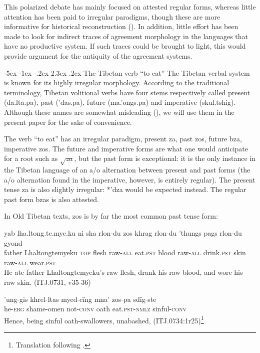 \documentclass[oldfontcommands,twoside,a4paper,12pt]{memoir}
\makeatletter
\newcommand{\ipa}[1]{{\phon #1}}
\newcommand{\allat}{\textsc{all}}
\newcommand{\conv}{\textsc{conv}}
\newcommand{\erg}{\textsc{erg}}
\newcommand{\nmlz}{\textsc{nmlz}}
\newcommand{\pst}{\textsc{pst}}
\newcommand{\topic}{\textsc{top}}
\newcommand{\racine}[1]{\begin{math}\sqrt{#1}\end{math}}
\renewcommand\section{\@startsection{section}{0}{\z@}%
                                   {-5ex \@plus -1ex \@minus -.2ex}%
                                   {2.3ex \@plus.2ex}%
                                   {\flushleft\large\bfseries}}
\makeatother
\begin{document}
This polarized debate has mainly focused on attested regular forms, whereas little attention has been paid to irregular paradigms, though these are more informative for historical reconstruction (\citealt{jacques07chang}). In addition, little effort has been made to look for indirect traces of agreement morphology in the languages that have no productive system. If such traces could be brought to light, this would provide argument for the antiquity of the agreement systems.

\section{The Tibetan verb ``to eat''}
The Tibetan verbal system is known for its highly irregular morphology. According to the traditional terminology, Tibetan volitional verbs have four stems respectively called present (da.lta.pa), past ('das.pa), future (ma.'ongs.pa) and imperative (skul.tshig). Although these names are somewhat misleading (\citealt{zeisler04}), we will use them in the present paper for the sake of convenience.

The verb ``to eat'' has an irregular paradigm, present \ipa{za}, past \ipa{zos}, future \ipa{bza}, imperative \ipa{zos}. The future and imperative forms are what one would anticipate for a root such as \racine{za}, but the past form is exceptional: it is the only instance in the Tibetan language of an a/o alternation between present and past forms (the a/o alternation found in the imperative, however, is entirely regular). The present tense \ipa{za} is also slightly irregular: *'dza would be expected instead. The regular past form \ipa{bzas} is also attested. 

In Old Tibetan texts, \ipa{zos} is by far the most common past tense form:

\begin{exe}
\ex \label{zos}
\gll	  yab lha.ltong.te.mye.ku ni sha rlon-du zos khrag rlon-du 'thungs pags rlon-du gyond \\
			father Lhaltongtemyeku \topic{} flesh raw-\allat{}  eat.\pst{} blood raw-\allat{} drink.\pst{} skin raw-\allat{} wear.\pst{} \\
\glt He ate father Lhaltongtemyeku's raw flesh, drank his raw blood, and wore his raw skin. (ITJ.0731, v35-36)
\end{exe}

\begin{exe}
\ex \label{zos2}
\gll	 'ung-gis khrel-ltas myed-cïng mna' zos-pa sdïg-ste \\
		he-\erg{} shame-omen not-\conv{} oath eat.\pst{}-\nmlz{} sinful-\conv{} \\ 
\glt Hence, being sinful oath-swallowers, unabashed, (ITJ.0734:1r25)\footnote{Translation following \citet[p. 77]{thomas57tibet}.}
\end{exe}
\end{document}
